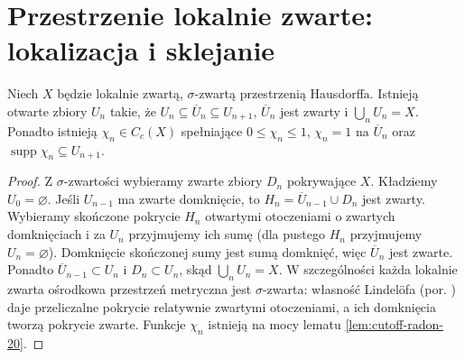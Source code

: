 \section{Przestrzenie lokalnie zwarte: lokalizacja i sklejanie}
\begin{lemat}
\label{lem:exhaustion-21}
Niech $X$ będzie lokalnie zwartą, $\sigma$-zwartą przestrzenią Hausdorffa. Istnieją otwarte zbiory $U_n$ takie, że
$U_n\subseteq\overline U_n\subseteq U_{n+1}$,
$\overline U_n$ jest zwarty i $\bigcup_nU_n=X$.
Ponadto istnieją $\chi_n\in C_c(X)$ spełniające
$0\le\chi_n\le1$, $\chi_n=1$ na $\overline U_n$
oraz $\operatorname{supp}\chi_n\subseteq U_{n+1}$.
\end{lemat}
\begin{proof}
Z $\sigma$-zwartości wybieramy zwarte zbiory $D_n$ pokrywające $X$. Kładziemy $U_0=\varnothing$. Jeśli $U_{n-1}$ ma zwarte domknięcie, to $H_n=\overline U_{n-1}\cup D_n$ jest zwarty. Wybieramy skończone pokrycie $H_n$ otwartymi otoczeniami o zwartych domknięciach i za $U_n$ przyjmujemy ich sumę (dla pustego $H_n$ przyjmujemy $U_n=\varnothing$). Domknięcie skończonej sumy jest sumą domknięć, więc $\overline U_n$ jest zwarte. Ponadto $\overline U_{n-1}\subset U_n$ i $D_n\subset U_n$, skąd $\bigcup_n U_n=X$. W szczególności każda lokalnie zwarta ośrodkowa przestrzeń metryczna jest $\sigma$-zwarta: własność Lindelöfa (por. ) daje przeliczalne pokrycie relatywnie zwartymi otoczeniami, a ich domknięcia tworzą pokrycie zwarte.
Funkcje $\chi_n$ istnieją na mocy lematu
\ref{lem:cutoff-radon-20}.
\end{proof}

